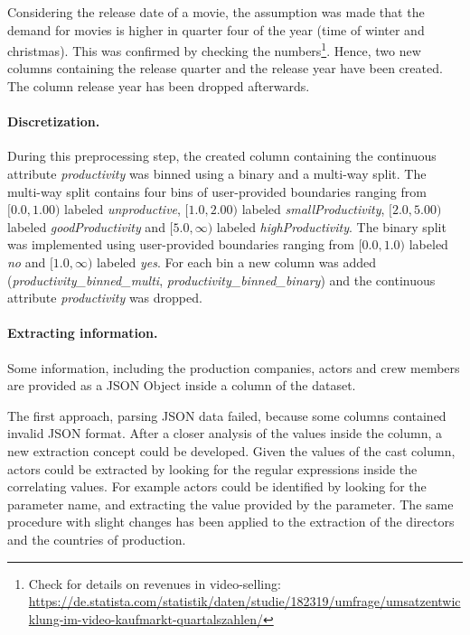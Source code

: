 Considering the release date of a movie, the assumption was made that the demand for movies is higher in quarter four of the year (time of winter and christmas). This was confirmed by checking the numbers\footnote{Check for details on revenues in video-selling: \hyperref{https://de.statista.com/statistik/daten/studie/182319/umfrage/umsatzentwicklung-im-video-kaufmarkt-quartalszahlen/}{link}{Statista revenue movies}{https://de.statista.com/statistik/daten/studie/182319/umfrage/umsatzentwicklung-im-video-kaufmarkt-quartalszahlen/}}. Hence, two new columns containing the release quarter and the release year have been created. The column release year has been dropped afterwards.

\paragraph{Discretization.}
During this preprocessing step, the created column containing the continuous attribute \textit{productivity} was binned using a binary and a multi-way split. The multi-way split contains four bins of user-provided boundaries ranging from $[0.0, 1.00)$ labeled \textit{unproductive}, $[1.0, 2.00)$ labeled \textit{smallProductivity}, $[2.0, 5.00)$ labeled \textit{goodProductivity} and $[5.0, \infty)$ labeled \textit{highProductivity}. The binary split was implemented using user-provided boundaries ranging from $[0.0, 1.0)$ labeled \textit{no} and $[1.0, \infty)$ labeled \textit{yes}. For each bin a new column was added (\textit{productivity\_binned\_multi}, \textit{productivity\_binned\_binary}) and the continuous attribute \textit{productivity} was dropped.

\paragraph{Extracting information.}
Some information, including the production companies, actors and crew members are provided as a JSON Object inside a column of the dataset. 

The first approach, parsing  JSON data failed, because  some columns contained invalid JSON format. After a closer analysis of the values inside the column, a new extraction concept could be developed. Given the values of the cast column, actors could be extracted by looking for the regular expressions inside the correlating values. For example actors could be identified by looking for the parameter name, and extracting the value provided by the parameter. The same procedure with slight changes has been applied to the extraction of the directors and the countries of production.

